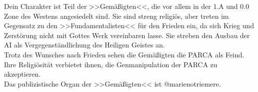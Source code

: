 Dein Charakter ist Teil der >>Gemäßigten<<, die vor allem in der 1.A und 0.0 Zone
des Westens angesiedelt sind. Sie sind streng religiös, aber treten im Gegensatz
zu den >>Fundamentalisten<< für den Frieden ein, da sich Krieg und Zerstörung
nicht mit Gottes Werk vereinbaren lasse. Sie streben den Ausbau der AI als
Vergegenständlichung des Heiligen Geistes an.\\
Trotz des Wunsches nach Frieden sehen die Gemäßigten die PARCA als Feind. Ihre
Religiösität verbietet ihnen, die Genmanipulation der PARCA zu akzeptieren.\\
Das publizistische Organ der >>Gemäßigten<< ist @marienotriemere.
